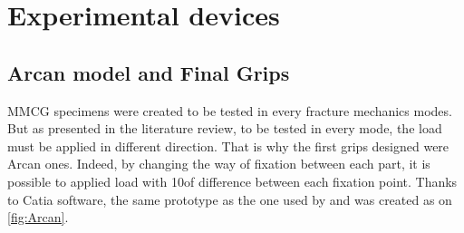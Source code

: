 \section{Experimental devices}



\subsection{Arcan model and Final Grips}

MMCG specimens were created to be tested in every fracture mechanics modes. But as presented in the literature review, to be tested in every mode, the load must be applied in different direction. That is why the first grips designed were Arcan ones. Indeed, by changing the way of fixation between each part, it is possible to applied load with 10\textdegree of difference between each fixation point. Thanks to Catia software, the same prototype as the one used by \parencite{Reference7} and \parencite{Reference6} was created as on \ref{fig:Arcan}.

